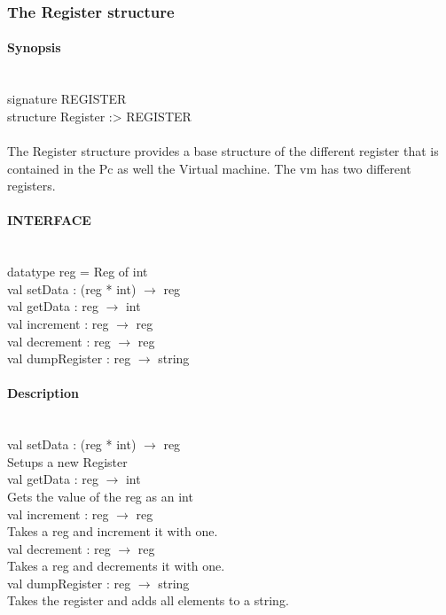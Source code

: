 \documentclass{article}
\begin{document}
\subsubsection{The Register structure}
\paragraph{Synopsis} \
\\
signature REGISTER\\
structure Register :> REGISTER\\
\\
The Register structure provides a base structure of the different register that
is contained in the Pc as well the Virtual machine. The vm has two different registers.\\
\paragraph{INTERFACE} \
\\
	datatype reg = Reg of int
\\
	val setData : (reg * int) $\rightarrow$ reg
\\	val getData : reg $\rightarrow$ int
\\	val increment : reg $\rightarrow$ reg
\\	val decrement : reg $\rightarrow$ reg
\\	val dumpRegister : reg $\rightarrow$ string
\paragraph{Description} \
\\

	val setData : (reg * int) $\rightarrow$ reg\\
		Setups a new Register \\
	val getData : reg $\rightarrow$ int	\\
		Gets the value of the reg as an int\\
	val increment : reg $\rightarrow$ reg\\
		Takes a reg and increment it with one.\\
	val decrement : reg $\rightarrow$ reg\\
		Takes a reg and decrements it with one.\\
	val dumpRegister : reg $\rightarrow$ string\\
		Takes the register and adds all elements to a string.\\
\end{document}
